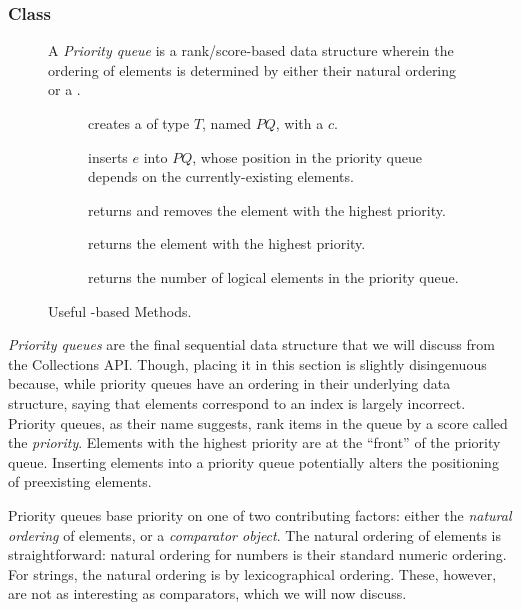 \subsubsection*{ Class}
\begin{figure}[tp]
  \small
  \begin{tcolorbox}[title=Java PriorityQueue]
    A \textit{Priority queue} is a rank/score-based data structure wherein the ordering of elements is determined by either their natural ordering or a .
    \vspace{2ex}
  \begin{description}
    \item [] creates a  of type $T$, named $PQ$, with a  $c$.
     \item [] inserts $e$ into $PQ$, whose position in the priority queue depends on the currently-existing elements.
     \item [] returns and removes the element with the highest priority.
     \item [] returns the element with the highest priority.
    \item [] returns the number of logical elements in the priority queue.
  \end{description}
\end{tcolorbox}
  \caption{Useful -based Methods.}
  \label{fig:priorityqueues}
\end{figure}
\textit{Priority queues} are the final sequential data structure that we will discuss from the Collections API. Though, placing it in this section is slightly disingenuous because, while priority queues have an ordering in their underlying data structure, saying that elements correspond to an index is largely incorrect. Priority queues, as their name suggests, rank items in the queue by a score called the \textit{priority}. Elements with the highest priority are at the ``front'' of the priority queue. Inserting elements into a priority queue potentially alters the positioning of preexisting elements.

Priority queues base priority on one of two contributing factors: either the \textit{natural ordering} of elements, or a \textit{comparator object}. The natural ordering of elements is straightforward: natural ordering for numbers is their standard numeric ordering. For strings, the natural ordering is by lexicographical ordering. These, however, are not as interesting as comparators, which we will now discuss.

